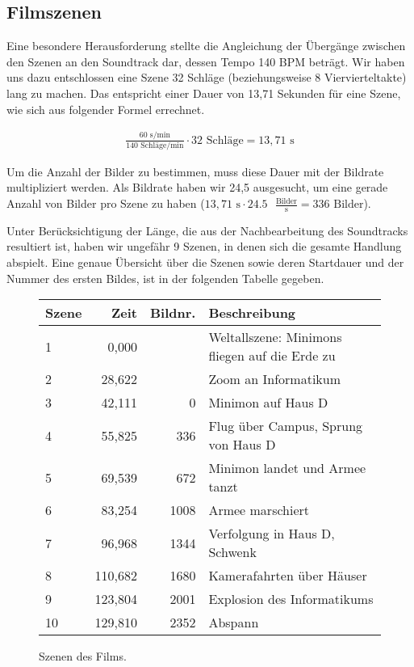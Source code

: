 \subsection{Filmszenen}

Eine besondere Herausforderung stellte die Angleichung der Übergänge zwischen den Szenen an den Soundtrack dar, dessen Tempo 140 BPM beträgt. Wir haben uns dazu entschlossen eine Szene 32 Schläge (beziehungsweise 8 Viervierteltakte) lang zu machen. Das entspricht einer Dauer von 13,71 Sekunden für eine Szene, wie sich aus folgender Formel errechnet.

\begin{align*}
	\frac{60 \text{ s/min}}{140 \text{ Schläge/min}} \cdot 32 \text{ Schläge} = 13,71 \text{ s}
\end{align*}

Um die Anzahl der Bilder zu bestimmen, muss diese Dauer mit der Bildrate multipliziert werden. Als Bildrate haben wir 24,5 ausgesucht, um eine gerade Anzahl von Bilder pro Szene zu haben ($13,71 \text{ s} \cdot 24.5\text{ } \frac{\text{Bilder}}{\text{s}} = 336 \text{ Bilder}$).

Unter Berücksichtigung der Länge, die aus der Nachbearbeitung des Soundtracks resultiert ist, haben wir ungefähr 9 Szenen, in denen sich die gesamte Handlung abspielt. Eine genaue Übersicht über die Szenen sowie deren Startdauer und der Nummer des ersten Bildes, ist in der folgenden Tabelle gegeben.

\begin{figure}[h]
	\begin{tabular}{p{1cm}rrp{9cm}}
		\textbf{Szene} & \textbf{Zeit} & \textbf{Bildnr.} & \textbf{Beschreibung} \\
		\hline
		1 & 0,000 & & Weltallszene: Minimons fliegen auf die Erde zu\\
		2 & 28,622 & & Zoom an Informatikum\\
		3 & 42,111 & 0 & Minimon auf Haus D\\
		4 & 55,825 & 336 & Flug über Campus, Sprung von Haus D\\
		5 & 69,539 & 672 & Minimon landet und Armee tanzt\\
		6 & 83,254 & 1008 & Armee marschiert\\
		7 & 96,968 & 1344 & Verfolgung in Haus D, Schwenk\\
		8 & 110,682 & 1680 & Kamerafahrten über Häuser\\
		9 & 123,804 & 2001 & Explosion des Informatikums\\
		10 & 129,810 & 2352 & Abspann\\
	\end{tabular}
	\caption{Szenen des Films.}
	\label{fig:scenes}
\end{figure}
